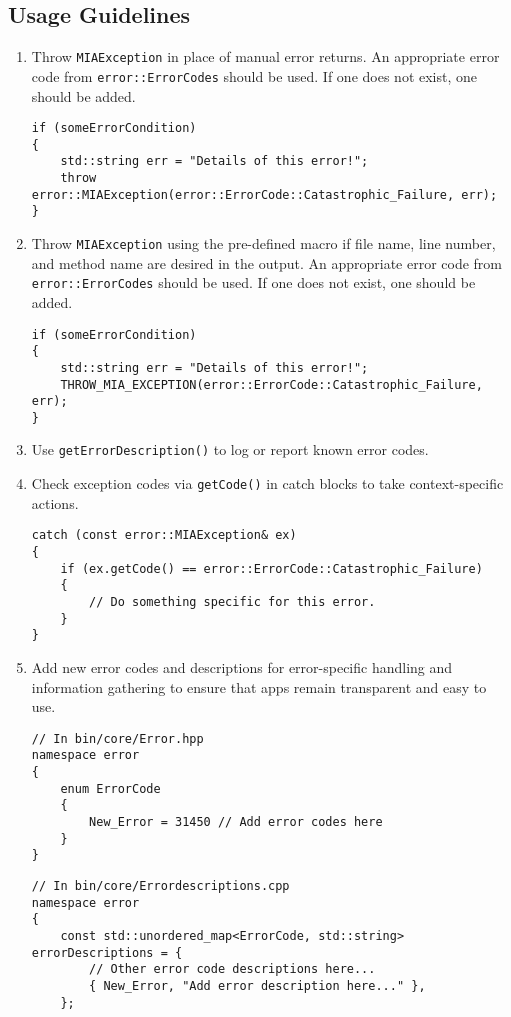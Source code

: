 \subsection*{Usage Guidelines}
\begin{enumerate}
	\item Throw \texttt{MIAException} in place of manual error returns. An appropriate error code from \texttt{error::ErrorCodes} should be used. If one does not exist, one should be added.
	\begin{lstlisting}[style=cppstyle]
if (someErrorCondition) 
{
    std::string err = "Details of this error!";
    throw error::MIAException(error::ErrorCode::Catastrophic_Failure, err); 
}
	\end{lstlisting}
	\item Throw \texttt{MIAException} using the pre-defined macro if file name, line number, and method name are desired in the output. An appropriate error code from \texttt{error::ErrorCodes} should be used. If one does not exist, one should be added.
	\begin{lstlisting}[style=cppstyle]
if (someErrorCondition) 
{
    std::string err = "Details of this error!";
    THROW_MIA_EXCEPTION(error::ErrorCode::Catastrophic_Failure, err); 
}
	\end{lstlisting}
	\item Use \texttt{getErrorDescription()} to log or report known error codes.
	\item Check exception codes via \texttt{getCode()} in catch blocks to take context-specific actions.
	\begin{lstlisting}[style=cppstyle]
catch (const error::MIAException& ex)
{
    if (ex.getCode() == error::ErrorCode::Catastrophic_Failure)
    {
    	// Do something specific for this error.
    }
}
	\end{lstlisting}
	\item Add new error codes and descriptions for error-specific handling and information gathering to ensure that apps remain transparent and easy to use.
	\begin{lstlisting}[style=cppstyle]
// In bin/core/Error.hpp
namespace error
{
    enum ErrorCode
    {
    	New_Error = 31450 // Add error codes here
    }
}
	\end{lstlisting}
	\begin{lstlisting}[style=cppstyle]
// In bin/core/Errordescriptions.cpp
namespace error
{
    const std::unordered_map<ErrorCode, std::string> errorDescriptions = {
    	// Other error code descriptions here...
        { New_Error, "Add error description here..." },
    };
	\end{lstlisting}
\end{enumerate}

